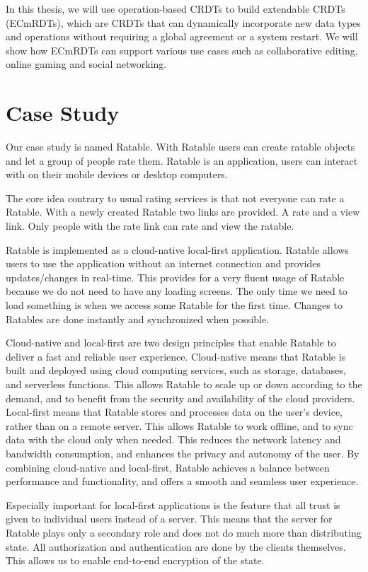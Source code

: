 \documentclass[
	ngerman,
	ruledheaders=section,   %
	class=report,		    %
	thesis={type=bachelor}, %
	accentcolor=9c,			%
	custommargins=true,    %
	marginpar=false,        %
	parskip=half-,          %
	fontsize=11pt,          %
]{tudapub}
\begin{document}
In this thesis, we will use operation-based CRDTs to build extendable CRDTs (ECmRDTs), which are CRDTs that can dynamically incorporate new data types and operations without requiring a global agreement or a system restart. We will show how ECmRDTs can support various use cases such as collaborative editing, online gaming and social networking.

\section{Case Study}
Our case study is named Ratable. With Ratable users can create ratable objects and let a group of people rate them. Ratable is an application, users can interact with on their mobile devices or desktop computers. 

The core idea contrary to usual rating services is that not everyone can rate a Ratable. With a newly created Ratable two links are provided. A rate and a view link. Only people with the rate link can rate and view the ratable.

Ratable is implemented as a cloud-native local-first application. Ratable allows users to use the application without an internet connection and provides updates/changes in real-time. This provides for a very fluent usage of Ratable because we do not need to have any loading screens. The only time we need to load something is when we access some Ratable for the first time. Changes to Ratables are done instantly and synchronized when possible.

Cloud-native and local-first are two design principles that enable Ratable to deliver a fast and reliable user experience. Cloud-native means that Ratable is built and deployed using cloud computing services, such as storage, databases, and serverless functions. This allows Ratable to scale up or down according to the demand, and to benefit from the security and availability of the cloud providers. Local-first means that Ratable stores and processes data on the user’s device, rather than on a remote server. This allows Ratable to work offline, and to sync data with the cloud only when needed. This reduces the network latency and bandwidth consumption, and enhances the privacy and autonomy of the user. By combining cloud-native and local-first, Ratable achieves a balance between performance and functionality, and offers a smooth and seamless user experience.

Especially important for local-first applications is the feature that all trust is given to individual users instead of a server. This means that the server for Ratable plays only a secondary role and does not do much more than distributing state. All authorization and authentication are done by the clients themselves. This allows us to enable end-to-end encryption of the state.
\end{document}
